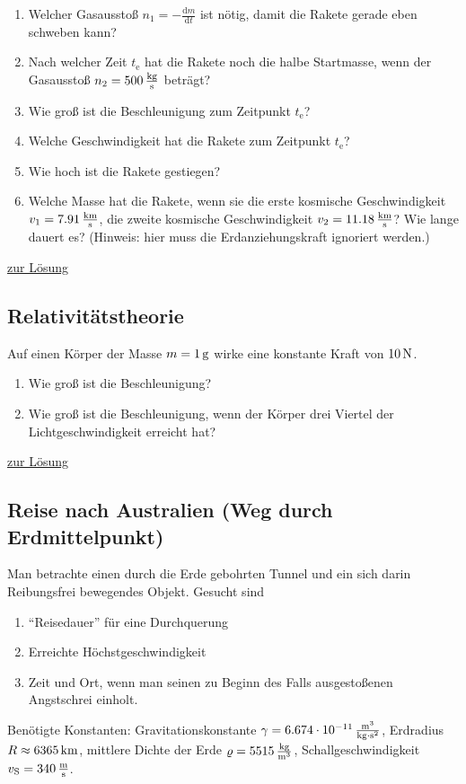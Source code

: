\documentclass[a4paper]{scrartcl}
\begin{document}
\begin{enumerate}[noitemsep]
  \item Welcher Gasausstoß $n_1 = -\frac{\text{d}m}{\text{d}t}$ ist nötig, damit die Rakete gerade eben schweben kann?
  \item Nach welcher Zeit $t_\text{e}$ hat die Rakete noch die halbe Startmasse, wenn der Gasausstoß $n_2 = \unit[500]{\frac{kg}{s}}$ beträgt?
  \item Wie groß ist die Beschleunigung zum Zeitpunkt $t_\text{e}$?
  \item Welche Geschwindigkeit hat die Rakete zum Zeitpunkt $t_\text{e}$?
  \item Wie hoch ist die Rakete gestiegen?
  \item Welche Masse hat die Rakete, wenn sie die erste kosmische Geschwindigkeit $v_1 = \unit[7.91]{\frac{km}{s}}$, die zweite kosmische Geschwindigkeit $v_2 = \unit[11.18]{\frac{km}{s}}$? Wie lange dauert es? (Hinweis: hier muss die Erdanziehungskraft ignoriert werden.)
\end{enumerate}

\hyperref[lsg:Raketenstart]{zur Lösung}

\subsection{Relativitätstheorie}
\label{aufg:Relativitaetstheorie}
Auf einen Körper der Masse $m=\unit[1]{g}$ wirke eine konstante Kraft von $\unit[10]{N}$.
\begin{enumerate}[noitemsep]
  \item Wie groß ist die Beschleunigung?
  \item Wie groß ist die Beschleunigung, wenn der Körper drei Viertel der Lichtgeschwindigkeit erreicht hat?
\end{enumerate}

\hyperref[lsg:Relativitaetstheorie]{zur Lösung}

\subsection{Reise nach Australien (Weg durch Erdmittelpunkt)}
\label{aufg:Australien}
Man betrachte einen durch die Erde gebohrten Tunnel und ein sich darin Reibungsfrei bewegendes Objekt. Gesucht sind
\begin{enumerate}[noitemsep]
  \item "`Reisedauer"' für eine Durchquerung
  \item Erreichte Höchstgeschwindigkeit
  \item Zeit und Ort, wenn man seinen zu Beginn des Falls ausgestoßenen Angstschrei einholt.
\end{enumerate}
Benötigte Konstanten: Gravitationskonstante $\gamma = \unit[6.674 \cdot 10^{-11}]{\frac{m^3}{kg \cdot s^2}}$, Erdradius $R \approx \unit[6365]{km}$, mittlere Dichte der Erde $\varrho = \unit[5515]{\frac{kg}{m^3}}$, Schallgeschwindigkeit $v_\text{S} = \unit[340]{\frac{m}{s}}$.
\end{document}
